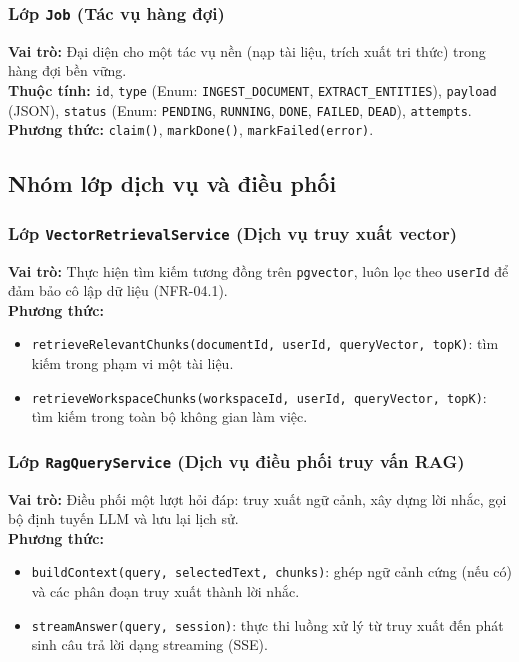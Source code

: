 \subsubsection{Lớp \texttt{Job} (Tác vụ hàng đợi)}
    \noindent\textbf{Vai trò:} Đại diện cho một tác vụ nền (nạp tài liệu, trích xuất tri thức) trong hàng đợi bền vững.\\
    \textbf{Thuộc tính:} \texttt{id}, \texttt{type} (Enum: \texttt{INGEST\_DOCUMENT}, \texttt{EXTRACT\_ENTITIES}), \texttt{payload} (JSON), \texttt{status} (Enum: \texttt{PENDING}, \texttt{RUNNING}, \texttt{DONE}, \texttt{FAILED}, \texttt{DEAD}), \texttt{attempts}.\\
    \textbf{Phương thức:} \texttt{claim()}, \texttt{markDone()}, \texttt{markFailed(error)}.

\subsection{Nhóm lớp dịch vụ và điều phối}

\subsubsection{Lớp \texttt{VectorRetrievalService} (Dịch vụ truy xuất vector)}
    \noindent\textbf{Vai trò:} Thực hiện tìm kiếm tương đồng trên \texttt{pgvector}, luôn lọc theo \texttt{userId} để đảm bảo cô lập dữ liệu (NFR-04.1).\\
    \textbf{Phương thức:}
    \begin{itemize}
        \item \texttt{retrieveRelevantChunks(documentId, userId, queryVector, topK)}: tìm kiếm trong phạm vi một tài liệu.
        \item \texttt{retrieveWorkspaceChunks(workspaceId, userId, queryVector, topK)}: tìm kiếm trong toàn bộ không gian làm việc.
    \end{itemize}

\subsubsection{Lớp \texttt{RagQueryService} (Dịch vụ điều phối truy vấn RAG)}
    \noindent\textbf{Vai trò:} Điều phối một lượt hỏi đáp: truy xuất ngữ cảnh, xây dựng lời nhắc, gọi bộ định tuyến LLM và lưu lại lịch sử.\\
    \textbf{Phương thức:}
    \begin{itemize}
        \item \texttt{buildContext(query, selectedText, chunks)}: ghép ngữ cảnh cứng (nếu có) và các phân đoạn truy xuất thành lời nhắc.
        \item \texttt{streamAnswer(query, session)}: thực thi luồng xử lý từ truy xuất đến phát sinh câu trả lời dạng streaming (SSE).
    \end{itemize}

